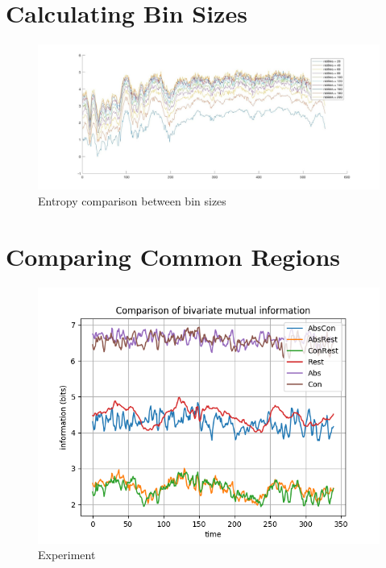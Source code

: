 \section{Calculating Bin Sizes}

\begin{figure}[!htb]
\caption{Entropy comparison between bin sizes}
\label{bins}
    \centering
    \includegraphics[width=1.2\textwidth]{fig/bins}
\end{figure}

\section{Comparing Common Regions}

\begin{figure}[!htb]
\caption{Experiment}
\label{all-channel-1}
    \centering
    \includegraphics[width=\textwidth]{fig/all-channel-1}
\end{figure}

